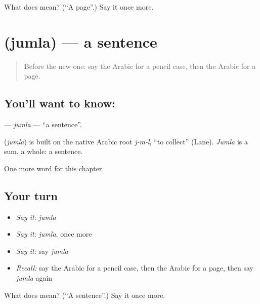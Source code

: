 \begin{tcolorbox}[breakable,colback=teal!4,colframe=teal!35!black,title={Before you move on}]
What does  mean? (\textquotedblleft{}A page\textquotedblright{}.) Say it once more.
\end{tcolorbox}
\section[\texorpdfstring{\ar{جملة} (jumla)}{جملة (jumla)}]{ (jumla) — a sentence}

\label{lesson:AR-C282-jumla}



\begin{quote}
Before the new one: say the Arabic for a pencil case, then the Arabic for a page.
\end{quote}

\subsection*{You'll want to know: }
\textbf{} — \emph{jumla} — \textquotedblleft{}a sentence\textquotedblright{}.

\begin{cousinweb}
\textbf{} (\emph{jumla}) is built on the native Arabic root \emph{j-m-l}, \textquotedblleft{}to collect\textquotedblright{} (Lane). \emph{Jumla} is a sum, a whole: a sentence.
\end{cousinweb}

\begin{grammarlens}[title={What you've built}]
One more word for this chapter.
\end{grammarlens}

\subsection*{Your turn}
\begin{itemize}
\raggedright
  \item \emph{Say it:} \emph{jumla}
  \item \emph{Say it:} \emph{jumla}, once more
  \item \emph{Say it:} say \emph{jumla}
  \item \emph{Recall:} say the Arabic for a pencil case, then the Arabic for a page, then say \emph{jumla} again
\end{itemize}

\begin{tcolorbox}[breakable,colback=teal!4,colframe=teal!35!black,title={Before you move on}]
What does  mean? (\textquotedblleft{}A sentence\textquotedblright{}.) Say it once more.
\end{tcolorbox}
